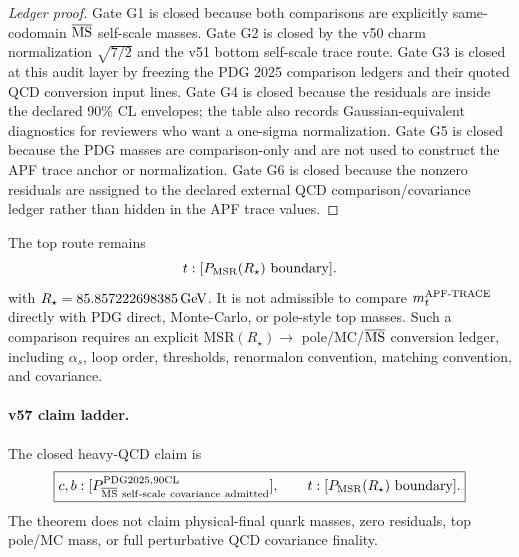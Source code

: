 \begin{proof}[Ledger proof]
Gate G1 is closed because both comparisons are explicitly same-codomain
\(\overline{\rm MS}\) self-scale masses.  Gate G2 is closed by the v50 charm
normalization \(\sqrt{7/2}\) and the v51 bottom self-scale trace route.  Gate
G3 is closed at this audit layer by freezing the PDG 2025 comparison ledgers and
their quoted QCD conversion input lines.  Gate G4 is closed because the residuals
are inside the declared 90\% CL envelopes; the table also records
Gaussian-equivalent diagnostics for reviewers who want a one-sigma normalization.
Gate G5 is closed because the PDG masses are comparison-only and are not used to
construct the APF trace anchor or normalization.  Gate G6 is closed because the
nonzero residuals are assigned to the declared external QCD comparison/covariance
ledger rather than hidden in the APF trace values.
\end{proof}

\begin{theorem}
The top route remains
\[
 t:[P_{\rm MSR}(R_\star)\ \mathrm{boundary}].
\]
with \(R_\star=85.857222698385\,{\rm GeV}\).  It is not admissible to compare
\(m_t^{\rm APF\text{-}TRACE}\) directly with PDG direct, Monte-Carlo, or
pole-style top masses.  Such a comparison requires an explicit
\(\mathrm{MSR}(R_\star)\to\) pole/MC/\(\overline{\rm MS}\) conversion ledger,
including \(\alpha_s\), loop order, thresholds, renormalon convention, matching
convention, and covariance.
\end{theorem}

\paragraph{v57 claim ladder.}
The closed heavy-QCD claim is
\[
\boxed{
 c,b:[P_{\rm \overline{MS}\ self\text{-}scale\ covariance\ admitted}^{\rm PDG2025,90CL}],
\qquad
 t:[P_{\rm MSR}(R_\star)\ \mathrm{boundary}].
}
\]
The theorem does not claim physical-final quark masses, zero residuals, top
pole/MC mass, or full perturbative QCD covariance finality.
